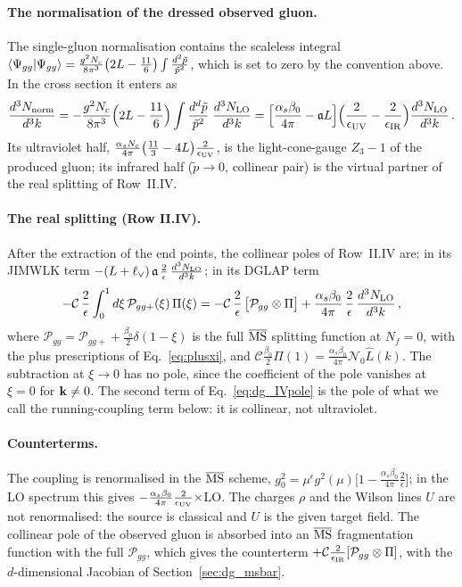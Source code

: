 \paragraph{The normalisation of the dressed observed gluon.} The single-gluon normalisation contains the scaleless integral $\braket{\Psi_{gg}|\Psi_{gg}}=\frac{g^2N_c}{8\pi^3}\big(2L-\frac{11}{6}\big)\int\frac{d^2\tilde p}{\tilde p^2}$, which is set to zero by the convention above. In the cross section it enters as
\begin{align}\label{eq:dg_norm}
\frac{d^3N_{\rm norm}}{d^3k}=-\frac{g^2N_c}{8\pi^3}\Big(2L-\frac{11}{6}\Big)\int\frac{d^d\tilde p}{\tilde p^2}\;\frac{d^3N_{\rm LO}}{d^3k}
=\Big[\frac{\alpha_s\beta_0}{4\pi}-\mathfrak aL\Big]\Big(\frac{2}{\epsilon_{\rm UV}}-\frac{2}{\epsilon_{\rm IR}}\Big)\frac{d^3N_{\rm LO}}{d^3k}\,.
\end{align}
Its ultraviolet half, $\frac{\alpha_sN_c}{4\pi}\big(\frac{11}{3}-4L\big)\frac{2}{\epsilon_{\rm UV}}$, is the light-cone-gauge $Z_3-1$ of the produced gluon; its infrared half ($\tilde p\to0$, collinear pair) is the virtual partner of the real splitting of Row~II.IV.

\paragraph{The real splitting (Row II.IV).} After the extraction of the end points, the collinear poles of Row~II.IV are: in its JIMWLK term $-(L+\ell_\vee)\,\mathfrak a\,\frac2\epsilon\,\frac{d^3N_{\rm LO}}{d^3k}$; in its DGLAP term
\begin{align}\label{eq:dg_IVpole}
-\mathcal C\,\frac2\epsilon\int_0^1d\xi\,\mathcal P_{gg+}(\xi)\,\Pi(\xi)=-\mathcal C\,\frac2\epsilon\,\big[\mathcal P_{gg}\otimes\Pi\big]+\frac{\alpha_s\beta_0}{4\pi}\,\frac2\epsilon\,\frac{d^3N_{\rm LO}}{d^3k}\,,
\end{align}
where $\mathcal P_{gg}=\mathcal P_{gg+}+\frac{\beta_0}{2}\delta(1-\xi)$ is the full $\overline{\rm MS}$ splitting function at $N_f=0$, with the plus prescriptions of Eq.~\eqref{eq:plusxi}, and $\mathcal C\frac{\beta_0}{2}\Pi(1)=\frac{\alpha_s\beta_0}{4\pi}\mathcal N_0\widehat L(k)$. The subtraction at $\xi\to0$ has no pole, since the coefficient of the pole vanishes at $\xi=0$ for $\mathbf{k}\neq0$. The second term of Eq.~\eqref{eq:dg_IVpole} is the pole of what we call the running-coupling term below: it is collinear, not ultraviolet.

\paragraph{Counterterms.} The coupling is renormalised in the $\overline{\rm MS}$ scheme, $g_0^2=\mu^\epsilon g^2(\mu)\big[1-\frac{\alpha_s\beta_0}{4\pi}\frac2\epsilon\big]$; in the LO spectrum this gives $-\frac{\alpha_s\beta_0}{4\pi}\frac{2}{\epsilon_{\rm UV}}\times$LO. The charges $\rho$ and the Wilson lines $U$ are not renormalised: the source is classical and $U$ is the given target field. The collinear pole of the observed gluon is absorbed into an $\overline{\rm MS}$ fragmentation function with the full $\mathcal P_{gg}$, which gives the counterterm $+\mathcal C\frac{2}{\epsilon_{\rm IR}}[\mathcal P_{gg}\otimes\Pi]$, with the $d$-dimensional Jacobian of Section~\ref{sec:dg_msbar}.

